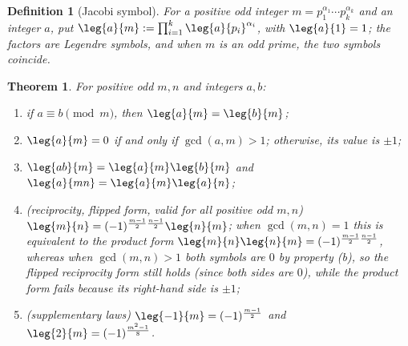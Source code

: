 \documentclass[11pt]{article}
\theoremstyle{ntstyle}
\newtheorem{theorem}{Theorem}[subsection]
\newtheorem{definition}{Definition}[subsection]
\begin{document}
\begin{definition}[Jacobi symbol]\label{def:7.6.1} For a positive
	odd integer $m = p_1^{\alpha_1} \cdots p_k^{\alpha_k}$ and an integer
	$a$, put $\leg{a}{m} := \prod_{i=1}^{k}\leg{a}{p_i}^{\alpha_i}$, with $\leg{a}{1} = 1$; the
	factors are Legendre symbols, and when $m$ is an odd prime, the two symbols coincide.

\end{definition}
\begin{theorem}\label{thm:7.6.1}
	For positive odd $m, n$ and integers $a, b$:

	\begin{enumerate}[label={\alph*)}]
		\item if $a \equiv b \pmod{m}$, then $\leg{a}{m} =
			      \leg{b}{m}$;
		\item $\leg{a}{m} = 0$ if and only if $\gcd(a, m) > 1$; otherwise, its value is $\pm 1$;
		\item $\leg{ab}{m} = \leg{a}{m}\leg{b}{m}$ and $\leg{a}{mn} = \leg{a}{m}\leg{a}{n}$;
		\item (reciprocity, flipped form, valid for all positive odd $m, n$)
		      $\leg{m}{n} = (-1)^{\frac{m-1}{2}\frac{n-1}{2}}\leg{n}{m}$; when
		      $\gcd(m, n) = 1$ this is equivalent to the product form
		      $\leg{m}{n}\leg{n}{m} = (-1)^{\frac{m-1}{2}\frac{n-1}{2}}$, whereas
		      when $\gcd(m, n) > 1$ both symbols are $0$ by property (b), so the flipped reciprocity form still holds (since both sides are $0$), while the product form fails because its right-hand side is $\pm 1$;
		\item (supplementary laws) $\leg{-1}{m} =
			      (-1)^{\frac{m-1}{2}}$ and $\leg{2}{m} = (-1)^{\frac{m^2-1}{8}}$.
	\end{enumerate}

\end{theorem}
\end{document}
